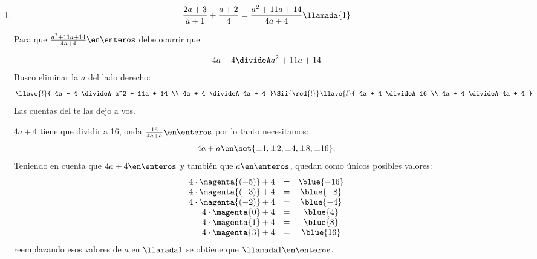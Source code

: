 \begin{enumerate}[label=\enumeracion*)]
  \item
        $$
          \frac{2a + 3}{a+1} + \frac{a+2}{4} = \frac{a^2 + 11a + 14}{4a+4} \llamada{1}
        $$

        Para que $\frac{a^2 + 11a + 14}{4a+4} \en \enteros$ debe ocurrir que

        $$
          4a + 4 \divideA a^2 + 11a + 14
        $$
        Busco eliminar la $a$ del lado derecho:
        $$
          \llave{l}{
            4a + 4 \divideA a^2 + 11a + 14 \\
            4a + 4 \divideA 4a + 4
          }
          \Sii{\red{!}}
          \llave{l}{
            4a + 4 \divideA 16 \\
            4a + 4 \divideA 4a + 4
          }
        $$
        Las cuentas del \red{!} te las dejo a vos.

        $4a+4$ tiene que dividir a 16, onda $\frac{16}{4a + a} \en \enteros$ por lo tanto necesitamos:
        $$
          4a + a \en \set{\pm1,\pm2,\pm4,\pm8,\pm16}.
        $$
        Teniendo en cuenta que $4a + 4 \en \enteros$ y también que $a \en \enteros$, quedan como únicos posibles valores:
        $$
          \begin{array}{rcc}
            4 \cdot \magenta{(-5)} + 4 & = & \blue{-16} \\
            4 \cdot \magenta{(-3)} + 4 & = & \blue{-8}  \\
            4 \cdot \magenta{(-2)} + 4 & = & \blue{-4}  \\
            4 \cdot \magenta{0} + 4    & = & \blue{4}   \\
            4 \cdot \magenta{1} + 4    & = & \blue{8}   \\
            4 \cdot \magenta{3} + 4    & = & \blue{16}
          \end{array}
        $$
        reemplazando esos valores de $a$ en $\llamada1$ se obtiene que  $ \llamada1 \en \enteros$.
\end{enumerate}

\begin{aportes}
  \item {}
  \item {}
  \item {}
\end{aportes}
